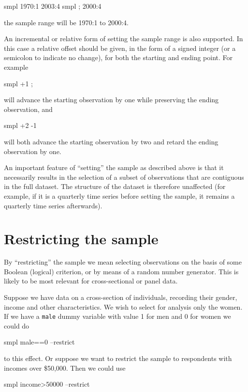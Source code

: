 \begin{code}
smpl 1970:1 2003:4
smpl ; 2000:4
\end{code}

the sample range will be 1970:1 to 2000:4.  

An incremental or relative form of setting the sample range is also
supported.  In this case a relative offset should be given, in the
form of a signed integer (or a semicolon to indicate no change), for
both the starting and ending point. For example

\begin{code}
smpl +1 ;
\end{code}

will advance the starting observation by one while preserving the
ending observation, and

\begin{code}
smpl +2 -1
\end{code}

will both advance the starting observation by two and retard the
ending observation by one.

An important feature of ``setting'' the sample as described above is
that it necessarily results in the selection of a subset of
observations that are contiguous in the full dataset. The structure of
the dataset is therefore unaffected (for example, if it is a quarterly
time series before setting the sample, it remains a quarterly time
series afterwards).

\section{Restricting the sample}
\label{sec:sample-restrict}

By ``restricting'' the sample we mean selecting observations on the
basis of some Boolean (logical) criterion, or by means of a random
number generator.  This is likely to be most relevant for
cross-sectional or panel data.

Suppose we have data on a cross-section of individuals, recording
their gender, income and other characteristics.  We wish to select for
analysis only the women.  If we have a \verb+male+ dummy variable
with value 1 for men and 0 for women we could do
%      
\begin{code}
smpl male==0 --restrict
\end{code}
%
to this effect.  Or suppose we want to restrict the sample to
respondents with incomes over \$50,000.  Then we could use
%
\begin{code}
smpl income>50000 --restrict
\end{code}


